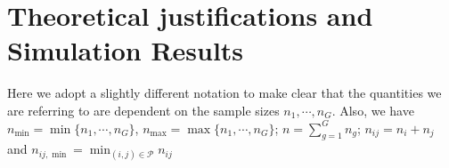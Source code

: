 \documentclass[times,sort&compress,3p]{elsarticle}
\theoremstyle{plain}%
\theoremstyle{definition}
\def\log{\hbox{log}}
\def\log{\hbox{log}}
\def\trans{^{\rm T}}
\newcommand{\uF}       {\mbox{\boldmath$F$}}
\newcommand{\uS}       {\mbox{\boldmath$S$}}
\newcommand{\uX}       {\mbox{\boldmath$X$}}
\begin{document}

\section{Theoretical justifications and Simulation Results} \label{sec:theori}
Here we adopt a slightly different notation to make clear that the quantities we are referring to are dependent on the sample sizes $n_1, \cdots, n_{G}$. Also, we have $n_{\min} = \min\{n_1,\cdots, n_{G}\}$, $n_{\max} = \max\{n_1,\cdots, n_{G}\}$; $n = \sum^{G}_{g=1}n_g$; $n_{ij} = n_i + n_j$ and $n_{ij,\min} = \min_{(i,j) \in \mathcal{P}} n_{ij}$ 
\end{document}
